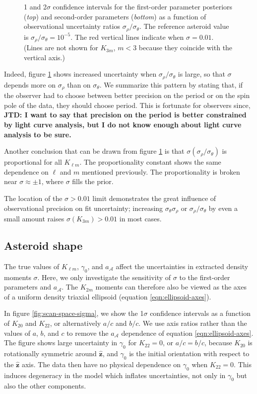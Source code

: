 \documentclass[fleqn,usenatbib]{mnras}
\newcommand{\jtd}[1]{ {\bf{\color{red} JTD: #1}} }
\newcommand{\unit}[1]{\bm{\hat{#1}}}
\begin{document}
\begin{figure}
  \caption{1 and 2$\sigma$ confidence intervals for the first-order parameter posteriors (\textit{top}) and second-order parameters (\textit{bottom}) as a function of observational uncertainty ratios $\sigma_\rho / \sigma_\theta$. The reference asteroid value is $\sigma_\rho/ \sigma_\theta =10^{-5}$. The red vertical lines indicate when $\sigma = 0.01$. (Lines are not shown for $K_{3m}$, $m < 3$ because they coincide with the vertical axis.)}
  \label{fig:scan-ratio}
\end{figure}

Indeed, figure  \ref{fig:scan-ratio} shows increased uncertainty when $\sigma_\rho/\sigma_\theta$ is large, so that $\sigma$ depends more on $\sigma_\rho$ than on $\sigma_\theta$. We summarize this pattern by stating that, if the observer had to choose between better precision on the period or on the spin pole of the data, they should choose period. This is fortunate for observers since, \jtd{I want to say that precision on the period is better constrained by light curve analysis, but I do not know enough about light curve analysis to be sure.}

Another conclusion that can be drawn from figure \ref{fig:scan-ratio} is that $\sigma(\sigma_\rho/\sigma_\theta)$ is proportional for all $K_{\ell m}$. The proportionality constant shows the same dependence on $\ell$ and $m$ mentioned previously. The proportionality is broken near $\sigma \approx \pm 1$, where $\sigma$ fills the prior.

The location of the $\sigma > 0.01$ limit demonstrates the great influence of observational precision on fit uncertainty; increasing $\sigma_\theta \sigma_\rho$ or $\sigma_\rho / \sigma_\theta$ by even a small amount raises $\sigma(K_{3m}) > 0.01$ in most cases.



\subsection{Asteroid shape}
\label{sec:scan-shape}

The true values of $K_{\ell m}$, $\gamma_0$, and $a_\mathcal{A}$ affect the uncertainties in extracted density moments $\sigma$. Here, we only investigate the sensitivity of $\sigma$ to the first-order parameters and $a_\mathcal{A}$. The $K_{2m}$ moments can therefore also be viewed as the axes of a uniform density triaxial ellipsoid (equation \ref{eqn:ellipsoid-axes}).

In figure \ref{fig:scan-space-sigma}, we show the 1$\sigma$ confidence intervals as a function of $K_{20}$ and $K_{22}$, or alternatively $a/c$ and $b/c$. We use axis ratios rather than the values of $a$, $b$, and $c$ to remove the $a_\mathcal{A}$ dependence of equation \ref{eqn:ellipsoid-axes}. The figure shows large uncertainty in $\gamma_0$ for $K_{22}=0$, or $a/c=b/c$, because $K_{20}$ is rotationally symmetric around $\unit z$, and $\gamma_0$ is the initial orientation with respect to the $\unit z$ axis. The data then have no physical dependence on $\gamma_0$ when $K_{22}=0$. This induces degeneracy in the model which inflates uncertainties, not only in $\gamma_0$ but also the other components.
\end{document}
